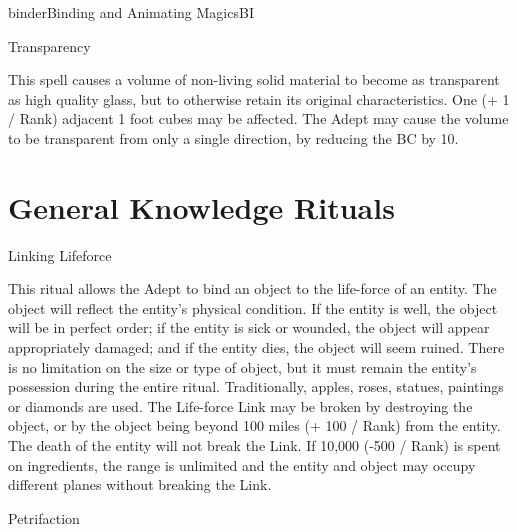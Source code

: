 \begin{College}[1.2]{binder}{Binding and Animating Magics}{BI}
\begin{spell}[G-10]{Transparency}
\begin{effects}
This spell causes a volume of non-living solid material to become as
transparent as high quality glass, but to otherwise retain its
original characteristics.  One (+ 1 / Rank) adjacent 1 foot cubes may
be affected.  The Adept may cause the volume to be transparent from
only a single direction, by reducing the BC by 10.
\end{effects}
\end{spell}


\section{General Knowledge Rituals}

\begin{ritual}[Q-1]{Linking Lifeforce}

\begin{effects}
This ritual allows the Adept to bind an object to the life-force of an
entity. The object will reflect the entity’s physical condition.  If
the entity is well, the object will be in perfect order; if the entity
is sick or wounded, the object will appear appropriately damaged; and
if the entity dies, the object will seem ruined.  There is no
limitation on the size or type of object, but it must remain the
entity’s possession during the entire ritual.  Traditionally, apples,
roses, statues, paintings or diamonds are used.  The Life-force Link
may be broken by destroying the object, or by the object being beyond
100 miles (+ 100 / Rank) from the entity.  The death of the entity
will not break the Link.  If 10,000 (-500 / Rank) is spent on
ingredients, the range is unlimited and the entity and object may
occupy different planes without breaking the Link.
\end{effects}
\end{ritual}

\begin{ritual}[Q-2]{Petrifaction}


\end{ritual}
\end{College}
